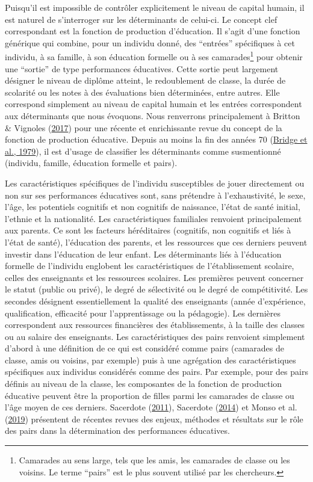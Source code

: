 \documentclass[
]{book}
\begin{document}
Puisqu'il est impossible de contrôler explicitement le niveau de capital humain, il est naturel de s'interroger sur les déterminants de celui-ci.
Le concept clef correspondant est la fonction de production d'éducation. Il s'agit d'une fonction générique qui combine, pour un individu donné, des ``entrées'' spécifiques à cet individu, à sa famille, à son éducation formelle ou à ses camarades\footnote{Camarades au sens large, tels que les amis, les camarades de classe ou les voisins. Le terme ``pairs'' est le plus souvent utilisé par les chercheurs.} pour obtenir une ``sortie'' de type performances éducatives. Cette sortie peut largement désigner le niveau de diplôme atteint, le redoublement de classe, la durée de scolarité ou les notes à des évaluations bien déterminées, entre autres. Elle correspond simplement au niveau de capital humain et les entrées correspondent aux déterminants que nous évoquons.
Nous renverrons principalement à Britton \& Vignoles (\protect\hyperlink{ref-BRI:VIG:17}{2017}) pour une récente et enrichissante revue du concept de la fonction de production éducative. Depuis au moins la fin des années 70 (\protect\hyperlink{ref-BRI:eal:79}{Bridge et al., 1979}), il est d'usage de classifier les déterminants comme susmentionné (individu, famille, éducation formelle et pairs).

\quad Les caractéristiques spécifiques de l'individu susceptibles de jouer directement ou non sur ses performances éducatives sont, sans prétendre à l'exhaustivité, le sexe, l'âge, les potentiels cognitifs et non cognitifs de naissance, l'état de santé initial, l'ethnie et la nationalité. Les caractéristiques familiales renvoient principalement aux parents. Ce sont les facteurs héréditaires (cognitifs, non cognitifs et liés à l'état de santé), l'éducation des parents, et les ressources que ces derniers peuvent investir dans l'éducation de leur enfant. Les déterminants liés à l'éducation formelle de l'individu englobent les caractéristiques de l'établissement scolaire, celles des enseignants et les ressources scolaires. Les premières peuvent concerner le statut (public ou privé), le degré de sélectivité ou le degré de compétitivité. Les secondes désignent essentiellement la qualité des enseignants (année d'expérience, qualification, efficacité pour l'apprentissage ou la pédagogie). Les dernières correspondent aux ressources financières des établissements, à la taille des classes ou au salaire des enseignants. Les caractéristiques des pairs renvoient simplement d'abord à une définition de ce qui est considéré comme pairs (camarades de classe, amis ou voisins, par exemple) puis à une agrégation des caractéristiques spécifiques aux individus considérés comme des pairs. Par exemple, pour des pairs définis au niveau de la classe, les composantes de la fonction de production éducative peuvent être la proportion de filles parmi les camarades de classe ou l'âge moyen de ces derniers. Sacerdote (\protect\hyperlink{ref-SAC:11}{2011}), Sacerdote (\protect\hyperlink{ref-SAC:14}{2014}) et Monso et al. (\protect\hyperlink{ref-MON:eal:19}{2019}) présentent de récentes revues des enjeux, méthodes et résultats sur le rôle des pairs dans la détermination des performances éducatives.
\end{document}
